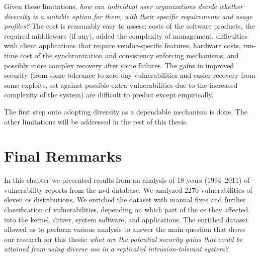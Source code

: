 Given these limitations, \emph{how can individual user organizations decide whether diversity is a suitable option for them, with their specific requirements and usage profiles?}
The cost is reasonably easy to assess: costs of the software products, the required middleware (if any), added the complexity of management, difficulties with client applications that require vendor-specific features, hardware costs, run-time cost of the synchronization and consistency enforcing mechanisms, and possibly more complex recovery after some failures.
The gains in improved security (from some tolerance to zero-day vulnerabilities and easier recovery from some exploits, set against possible extra vulnerabilities due to the increased complexity of the system) are difficult to predict except empirically. 


The first step onto adopting diversity as a dependable mechanism is done. 
The other limitations will be addressed in the rest of this thesis. 


\section{Final Remmarks}

In this chapter we presented results from an analysis of 18 years (1994--2011) of vulnerability reports from the \gls{nvd}  database. 
We analyzed 2270 vulnerabilities of eleven \gls{os} distributions. 
We enriched the dataset with manual fixes and further classification of vulnerabilities, depending on which part of the \gls{os} they affected, into the kernel, driver, system software, and applications. The enriched dataset allowed us to perform various analysis to answer the main question that drove our research for this thesis: \emph{what are the potential security gains that could be attained from using diverse \glspl{os} in a replicated intrusion-tolerant system?}
 
